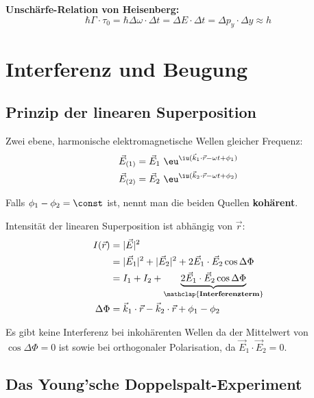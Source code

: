 			\textbf{Unschärfe-Relation von Heisenberg:}
			\[
				\hbar\Gamma \cdot \tau_0 = \hbar\Delta\omega \cdot \Delta t
					= \Delta E \cdot \Delta t = \Delta p_y \cdot \Delta y \approx h
			\]
\section{Interferenz und Beugung} %
	\subsection{Prinzip der linearen Superposition} %
		Zwei ebene, harmonische elektromagnetische Wellen gleicher Frequenz:
		\begin{align*}
			\vec E_{(1)} &= \vec E_1 \ \eu^{\iu (\vec k_1 \cdot \vec r - \omega t + \phi_1)} \\
			\vec E_{(2)} &= \vec E_2 \ \eu^{\iu (\vec k_2 \cdot \vec r - \omega t + \phi_2)}
		\end{align*}
		
		Falls $\phi_1 - \phi_2 = \const$ ist, nennt man die beiden Quellen \textbf{kohärent}.
		
		Intensität der linearen Superposition ist abhängig von $\vec r$:
		\begin{align*}
			I(\vec r) &= |\vec E|^2 \\
			&= |\vec E_1|^2 + |\vec E_2|^2 + 2 \vec E_1 \cdot \vec E_2 \cos \Delta \Phi \\
			&= I_1 + I_2 + \underbrace{
				2 \vec E_1 \cdot \vec E_2 \cos \Delta \Phi
			}_{\mathclap{\text{\textbf{Interferenzterm}}}} \\
			\Delta \Phi &= \vec k_1 \cdot \vec r - \vec k_2 \cdot \vec r + \phi_1 - \phi_2
		\end{align*}
		
		Es gibt keine Interferenz bei inkohärenten Wellen da der Mittelwert von
		$\cos \Delta \Phi = 0$ ist sowie bei orthogonaler Polarisation, da
		$\vec E_1 \cdot \vec E_2 = 0$.
	\subsection{Das Young'sche Doppelspalt-Experiment} %
		\begin{center}
				
		\end{center}
		
